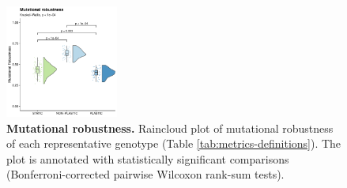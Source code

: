 \begin{figure}[ht!]
    \centering
    \includegraphics[width=0.33\textwidth]{media/mutational_robustness.pdf}
    \caption{\small
        \textbf{Mutational robustness.}
        Raincloud plot of mutational robustness of each representative genotype (Table \ref{tab:metrics-definitions}).
        The plot is annotated with statistically significant comparisons (Bonferroni-corrected pairwise Wilcoxon rank-sum tests). 
    }
    \label{fig:mutational-robustness}
\end{figure}